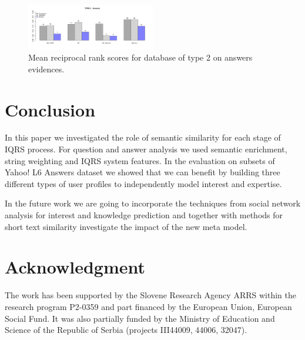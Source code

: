 \documentclass[conference]{IEEEtran}
\begin{document}
\begin{figure}[!t]
	\setlength{\belowcaptionskip}{-15pt}
	\setlength{\abovecaptionskip}{-10pt}
	\centering
	\includegraphics[width=0.5\textwidth]{mrrType2Answers.pdf}
	\caption{Mean reciprocal rank scores for database of type 2 on answers evidences.}
	\label{fig:mrrtype2}
\end{figure}


\section{Conclusion}
\label{sec:conclusion}
In this paper we investigated the role of semantic similarity for each stage of IQRS process. For question and answer analysis we used semantic enrichment, string weighting and IQRS system features. In the evaluation on subsets of Yahoo! L6 Answers dataset we showed that we can benefit by building three different types of user profiles to independently model interest and expertise.

In the future work we are going to incorporate the techniques from social network analysis for interest and knowledge prediction and together with methods for short text similarity investigate the impact of the new meta model.






\section*{Acknowledgment}
The work has been supported by the Slovene Research Agency ARRS within the research program P2-0359 and part financed by the European Union, European Social Fund. It was also partially funded by the Ministry of Education and Science of the Republic of Serbia (projects III44009, 44006, 32047).





\end{document}

